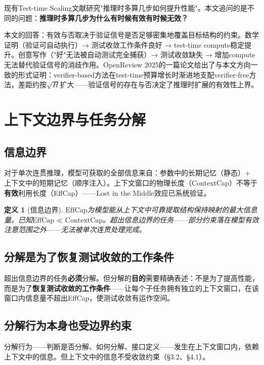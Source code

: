 \documentclass[11pt,a4paper]{ctexart}
\newtheorem{definition}[theorem]{定义}
\begin{document}
现有Test-time Scaling文献\cite{SETS2025,IAD2025,ReVeal2025}研究"推理时多算几步如何提升性能"。本文追问的是不同的问题：\textbf{推理时多算几步为什么有时候有效有时候无效？}

本文的回答：有效与否取决于验证信号是否足够密集地覆盖目标结构的约束。数学证明（验证可自动执行）→ 测试收敛工作条件良好 → test-time compute稳定提升。创意写作（"好"无法被自动测试完全捕获）→ 测试收敛缺失 → 增加compute无法替代验证信号的消歧作用。OpenReview 2025的一篇论文给出了与本文方向一致的形式证明：verifier-based方法在test-time预算增长时渐进地支配verifier-free方法，差距约按$\sqrt{H}$扩大——验证信号的存在与否决定了推理时扩展的有效性上界。


\section{上下文边界与任务分解}

\subsection{信息边界}

对于单次连贯推理，模型可获取的全部信息来自：参数中的长期记忆（静态）+ 上下文中的短期记忆（顺序注入）。上下文窗口的物理长度（ContextCap）不等于\textbf{有效}利用长度（EffCap）——Lost in the Middle效应\cite{Liu2024LostMiddle}已系统验证。

\begin{definition}[信息边界]
    $\mathrm{EffCap}$为模型能从上下文中可靠提取结构保持映射的最大信息量。已知$\mathrm{EffCap} \ll \mathrm{ContextCap}$。超出信息边界的任务——部分约束落在模型有效注意范围之外——无法被单次连贯处理完成。
\end{definition}

\subsection{分解是为了恢复测试收敛的工作条件}

超出信息边界的任务\textbf{必须}分解。但分解的\textbf{目的}需要精确表述：不是为了提高性能，而是为了\textbf{恢复测试收敛的工作条件}——让每个子任务拥有独立的上下文窗口，在该窗口内信息量不超出EffCap，使测试收敛有运作空间。

\subsection{分解行为本身也受边界约束}

分解行为——判断是否分解、如何分解、接口定义——发生在上下文窗口内，依赖上下文中的信息。但上下文中的信息不受收敛约束（§3.2、§4.1）。
\end{document}
